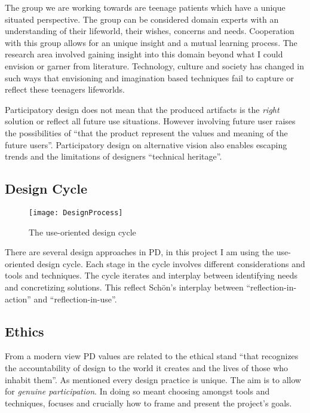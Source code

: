 \documentclass[11pt,UKenglish, a4paper]{article}
\begin{document}
The group we are working towards are teenage patients which have a unique situated perspective. The group can be considered domain experts with an understanding of their lifeworld, their wishes, concerns and needs. Cooperation with this group allows for an unique insight and a mutual learning process. The research area involved gaining insight into this domain beyond what I could envision or garner from literature. Technology, culture and society has changed in such ways that envisioning and imagination based techniques fail to capture or reflect these teenagers lifeworlds. 

Participatory design does not mean that the produced artifacts is the \textit{right} solution or reflect all future use situations. However involving future user raises the possibilities of ``that the product represent the values and meaning of the future users''\cite[p.3]{Velden2014Participatory}. Participatory design on alternative vision also enables escaping trends and the limitations of designers ``technical heritage''\cite{Feng2008Thinking}. 


\subsection{Design Cycle}
\begin{figure}[DesignProcess]
    \centering
	\texttt{[image: DesignProcess]}
    \caption{The use-oriented design cycle \cite[p~.128]{Bratteteig2013Organising}}
    \label{The use-oriented design cycle}
\end{figure}
There are several design approaches in PD, in this project I am using the use-oriented design cycle. Each stage in the cycle involves different considerations and tools and techniques. The cycle iterates and interplay between identifying needs and concretizing solutions. This reflect Schön's interplay between ``reflection-in-action'' and ``reflection-in-use''\cite[p.~23]{Loewgren2004Thoughtful}.

\subsection*{Ethics}

From a modern view PD values are related to the ethical stand ``that recognizes the accountability of design to the world it creates and the lives of those who inhabit them''\cite[p.~5]{Simonsen2012Routledge}. As mentioned every design practice is unique. The aim is to allow for \textit{genuine participation}. In doing so meant choosing amongst tools and techniques, focuses and crucially how to frame and present the project's goals. 
\end{document}
